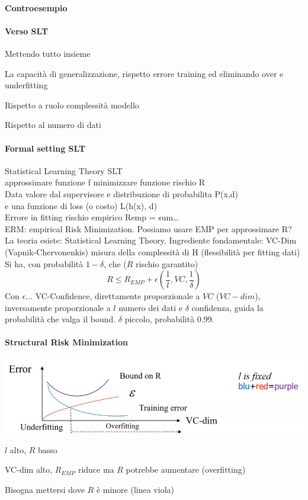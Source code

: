 \documentclass[10pt]{book}
\begin{document}
\paragraph{Controesempio} %
\paragraph{Verso SLT} Mettendo tutto insieme
\begin{list}{}{}
	\item La capacità di generalizzazione, rispetto errore training ed eliminando over e underfitting
	\item Rispetto a ruolo complessità modello
	\item Rispetto al numero di dati
\end{list}
\paragraph{Formal setting SLT} Statistical Learning Theory SLT\\
approssimare funzione f minimizzare funzione rischio R\\
Data valore dal supervisore e distribuzione di probabilita P(x,d)\\
e una funzione di loss (o costo) L(h(x), d)\\
Errore in fitting rischio empirico Remp = sum\ldots\\
ERM: empirical Risk Minimization. Possiamo usare EMP per approssimare R?\\
La teoria esiste: Statistical Learning Theory. Ingrediente fondamentale: VC-Dim (Vapnik-Chervonenkis) misura della complessità di H (flessibilità per fitting dati)
Si ha, con probabilità $1 -\delta$, che ($R$ rischio garantito)
$$R\leq R_{EMP} + \epsilon\left(\frac{1}{l}, VC, \frac{1}{\delta}\right)$$
Con $\epsilon\ldots$ VC-Confidence, direttamente proporzionale a $VC$ ($VC-dim$), inversamente proporzionale a $l$ numero dei dati e $\delta$ confidenza, guida la probabilità che valga il bound. $\delta$ piccolo, probabilità 0.99.
\paragraph{Structural Risk Minimization}
\begin{center}
\includegraphics[scale=0.7]{vc-dim.png}
\end{center}
\begin{list}{}{\textbf{Intuizione}}
	\item $l$ alto, $R$ basso
	\item VC-dim alto, $R_{EMP}$ riduce ma $R$ potrebbe aumentare (overfitting)
\end{list}
Bisogna mettersi dove $R$ è minore (linea viola)
\end{document}
